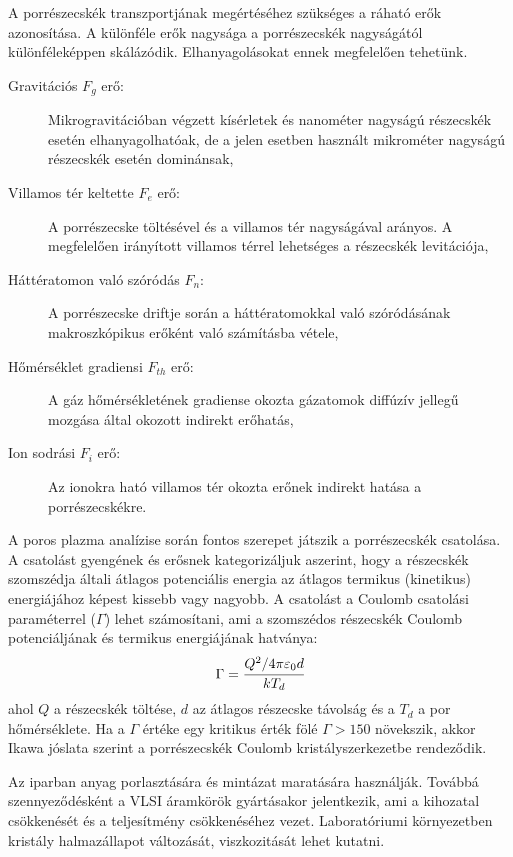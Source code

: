 	A porrészecskék transzportjának megértéséhez szükséges a ráható erők azonosítása.
	A különféle erők nagysága a porrészecskék nagyságától különféleképpen skálázódik. Elhanyagolásokat
	ennek megfelelően tehetünk.
	\begin{description}
		\item[Gravitációs $F_g$ erő:] Mikrogravitációban végzett kísérletek és nanométer nagyságú részecskék esetén
			elhanyagolhatóak, de a jelen esetben használt mikrométer nagyságú részecskék esetén dominánsak,
		\item[Villamos tér keltette $F_e$ erő:] A porrészecske töltésével és a villamos tér nagyságával
			arányos. A megfelelően irányított villamos térrel lehetséges a részecskék levitációja,  
		\item[Háttératomon való szóródás $F_n$:] A porrészecske driftje során a háttératomokkal való
			szóródásának makroszkópikus erőként való számításba vétele,
		\item[Hőmérséklet gradiensi $F_{th}$ erő:] A gáz hőmérsékletének gradiense okozta
			gázatomok diffúzív jellegű mozgása által okozott indirekt erőhatás,
		\item[Ion sodrási $F_i$ erő:] Az ionokra ható villamos tér okozta erőnek indirekt hatása a
			porrészecskékre.
	\end{description}
	A poros plazma analízise során fontos szerepet játszik a porrészecskék csatolása.
	A csatolást gyengének és erősnek kategorizáljuk aszerint, hogy a részecskék szomszédja általi
	átlagos potenciális energia az átlagos termikus (kinetikus) energiájához képest kissebb vagy
	nagyobb.
	A csatolást a Coulomb csatolási paraméterrel ($\Gamma$) lehet számosítani, ami a szomszédos
	részecskék Coulomb potenciáljának és termikus energiájának hatványa:
	\begin{equation}
		\Gamma = \cfrac{Q^2 / 4\pi\varepsilon_0 d}{kT_d} 
	\end{equation}
	ahol $Q$ a részecskék töltése, $d$ az átlagos részecske távolság és a $T_d$ a por hőmérséklete.
	Ha a $\Gamma$ értéke egy kritikus érték fölé $\Gamma > 150$ növekszik, akkor
	Ikawa jóslata szerint a porrészecskék Coulomb kristályszerkezetbe rendeződik.
	
	Az iparban anyag porlasztására és mintázat maratására használják. Továbbá szennyeződésként a VLSI
	áramkörök gyártásakor jelentkezik, ami a kihozatal csökkenését és a teljesítmény csökkenéséhez
	vezet. Laboratóriumi környezetben kristály halmazállapot változását, viszkozitását lehet kutatni. 

